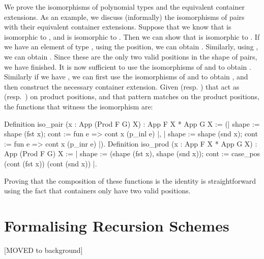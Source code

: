 \documentclass{llncs}
\begin{document}
We prove the isomorphisms of polynomial types and the equivalent 
container extensions. As an example, we discuss (informally) the isomorphisms
of pairs with their equivalent container extensions. Suppose that we
know that  is isomorphic to , and
 is isomorphic to . Then we can
show that  is isomorphic to
.  If we have an element of type 
,
using the  position, we can obtain
.  Similarly, using , we can
obtain . Since these are the only two valid positions
in the shape of pairs, we have finished. It is now sufficient to use the
isomorphisms of  and  to
obtain . Similarly if we have ,
we can first use the isomorphisms of 
 and
 to obtain
, and then construct the necessary container
extension. Given  (resp. ) that
act as  (resp.\ ) on product positions, and
 that pattern
matches on the product positions, the functions that witness the isomorphism
are:
\begin{coqcode}
Definition iso_pair (x : App (Prod F G) X) : App F X * App G X :=
  ({| shape := shape (fst x); cont := fun e => cont x (p_inl e) |}, 
   {| shape := shape (snd x); cont := fun e => cont x (p_inr e) |}).
Definition iso_prod (x : App F X * App G X) : App (Prod F G) X :=
{| shape := (shape (fst x), shape (snd x));
   cont := case_pos (cont (fst x)) (cont (snd x)) |}.
\end{coqcode}
Proving that the composition of these functions is the identity is
straightforward using the fact that  containers only have two valid
positions.

\section{Formalising Recursion Schemes}
\label{sec:recursion-schemes}
[MOVED to background]
\end{document}
